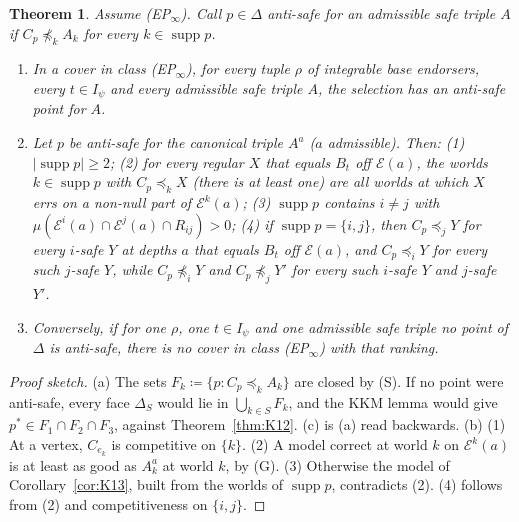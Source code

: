 \documentclass[11pt]{article}
\newtheorem{theorem}{Theorem}[section]
\theoremstyle{definition}
\theoremstyle{remark}
\newcommand{\supp}{\operatorname{supp}}
\begin{document}
\begin{theorem}\label{thm:K16}
Assume (EP$_\infty$). Call $p\in\Delta$ \emph{anti-safe} for an admissible safe triple $A$ if $C_p\not\preceq_kA_k$ for every $k\in\supp p$.
\begin{enumerate}[leftmargin=*,label=(\alph*)]
\item In a cover in class (EP$_\infty$), for every tuple $\rho$ of integrable base endorsers, every $t\in I_\psi$ and every admissible safe triple $A$, the selection has an anti-safe point for $A$.
\item Let $p$ be anti-safe for the canonical triple $A^a$ ($a$ admissible). Then: (1) $|\supp p|\ge2$; (2) for every regular $X$ that equals $B_t$ off $\mathcal E(a)$, the worlds $k\in\supp p$ with $C_p\preceq_kX$ (there is at least one) are all worlds at which $X$ errs on a non-null part of $\mathcal E^k(a)$; (3) $\supp p$ contains $i\ne j$ with $\mu(\mathcal E^i(a)\cap\mathcal E^j(a)\cap R_{ij})>0$; (4) if $\supp p=\{i,j\}$, then $C_p\preceq_jY$ for every $i$-safe $Y$ at depths $a$ that equals $B_t$ off $\mathcal E(a)$, and $C_p\preceq_iY$ for every such $j$-safe $Y$, while $C_p\not\preceq_iY$ and $C_p\not\preceq_jY'$ for every such $i$-safe $Y$ and $j$-safe $Y'$.
\item Conversely, if for one $\rho$, one $t\in I_\psi$ and one admissible safe triple no point of $\Delta$ is anti-safe, there is no cover in class (EP$_\infty$) with that ranking.
\end{enumerate}
\end{theorem}
\begin{proof}[Proof sketch]
(a) The sets $F_k\coloneqq\{p:C_p\preceq_kA_k\}$ are closed by (S). If no point were anti-safe, every face $\Delta_S$ would lie in $\bigcup_{k\in S}F_k$, and the KKM lemma would give $p^*\in F_1\cap F_2\cap F_3$, against Theorem~\ref{thm:K12}. (c) is (a) read backwards. (b) (1) At a vertex, $C_{e_k}$ is competitive on $\{k\}$. (2) A model correct at world $k$ on $\mathcal E^k(a)$ is at least as good as $A^a_k$ at world $k$, by (G). (3) Otherwise the model of Corollary~\ref{cor:K13}, built from the worlds of $\supp p$, contradicts (2). (4) follows from (2) and competitiveness on $\{i,j\}$.
\end{proof}
\end{document}
